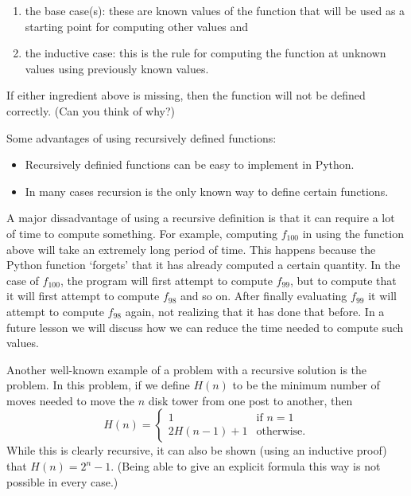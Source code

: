 \documentclass{ximera}
\begin{document}
	\begin{enumerate}
	\item the base case(s): these are known values of the function that will be used as a starting point for computing other values and 
	\item the inductive case: this is the rule for computing the function at unknown values using previously known values.
	\end{enumerate}

If either ingredient above is missing, then the function will not be defined correctly. (Can you think of why?)

Some advantages of using recursively defined functions:

	\begin{itemize}
		\item Recursively definied functions can be easy to implement in Python.
		\item In many cases recursion is the only known way to define certain functions.

	\end{itemize}

A major dissadvantage of using a recursive definition is that it can require a lot of time to compute something. For example, computing $f_{100}$ in using the function above will take an extremely long period of time. This happens because the Python function `forgets' that it has already computed a certain quantity. In the case of $f_{100}$, the program will first attempt to compute $f_{99}$, but to compute that it will first attempt to compute $f_{98}$ and so on. After finally evaluating $f_{99}$ it will attempt to compute $f_{98}$ again, not realizing that it has done that before. In a future lesson we will discuss how we can reduce the time needed to compute such values.

Another well-known example of a problem with a recursive solution is the  problem. In this problem, if we define $H(n)$ to be the minimum number of moves needed to move the $n$ disk tower from one post to another, then $$H(n) = \begin{cases}1 & \text{if $n=1$}\\ 2H(n-1) + 1 & \text{otherwise.}\end{cases}$$ While this is clearly recursive, it can also be shown (using an inductive proof) that $H(n)=2^n-1$. (Being able to give an explicit formula this way is not possible in every case.)
\end{document}
